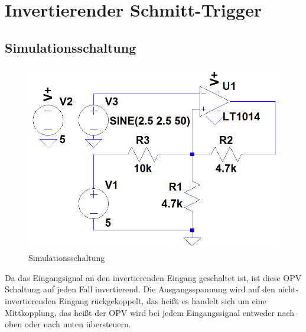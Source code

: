 
\section{Invertierender Schmitt-Trigger}
\subsection{Simulationsschaltung}
\begin{figure}[H]
  \begin{center}
    \includegraphics[width=1\textwidth]{./Schaltungen/InvertierenderSchmittTrigger.png}
    \caption{Simulationsschaltung}
  \end{center}
\end{figure}
\noindent
Da das Eingangsignal an den invertierenden Eingang geschaltet ist, ist diese OPV Schaltung auf jeden Fall invertierend. Die Ausgangsspannung wird auf den nicht-invertierenden Eingang r\"uckgekoppelt, das hei\ss{}t es handelt sich um eine Mittkopplung, das hei\ss{}t der OPV wird bei jedem Eingangssignal entweder nach oben oder nach unten \"ubersteuern. \newpage

